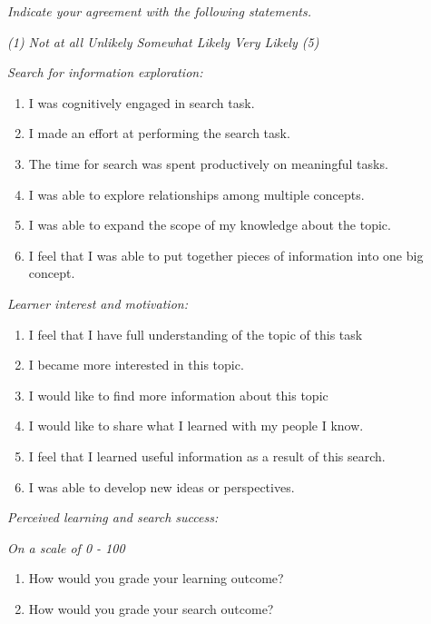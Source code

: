 \documentclass[letterpaper, nobind]{templates/ociamthesis}
\begin{document}
\emph{Indicate your agreement with the following statements.}

\emph{(1) Not at all \textbar{} Unlikely \textbar{} Somewhat \textbar{} Likely \textbar{} Very Likely (5)}

\emph{Search for information exploration:}

\begin{enumerate}
\def\labelenumi{\arabic{enumi}.}
\item
  I was cognitively engaged in search task.
\item
  I made an effort at performing the search task.
\item
  The time for search was spent productively on meaningful tasks.
\item
  I was able to explore relationships among multiple concepts.
\item
  I was able to expand the scope of my knowledge about the topic.
\item
  I feel that I was able to put together pieces of information into
  one big concept.
\end{enumerate}

\emph{Learner interest and motivation:}

\begin{enumerate}
\def\labelenumi{\arabic{enumi}.}
\setcounter{enumi}{6}
\item
  I feel that I have full understanding of the topic of this task
\item
  I became more interested in this topic.
\item
  I would like to find more information about this topic
\item
  I would like to share what I learned with my people I know.
\item
  I feel that I learned useful information as a result of this search.
\item
  I was able to develop new ideas or perspectives.
\end{enumerate}

\emph{Perceived learning and search success:}

\emph{On a scale of 0 - 100}

\begin{enumerate}
\def\labelenumi{\arabic{enumi}.}
\setcounter{enumi}{12}
\item
  How would you grade your learning outcome?
\item
  How would you grade your search outcome?
\end{enumerate}
\end{document}
